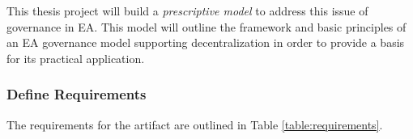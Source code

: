 This thesis project will build a \textit{prescriptive model} to address this issue of governance in EA. This model will outline the framework and basic principles of an EA governance model supporting decentralization in order to provide a basis  for its practical application. 



%
%
%


\subsubsection*{Define Requirements}

The requirements for the artifact are outlined in Table \ref{table:requirements}.

